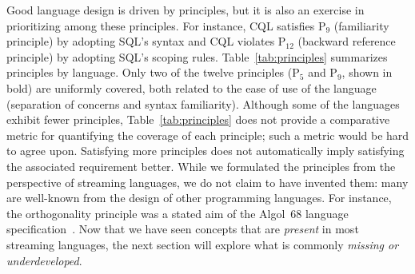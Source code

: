 Good language design is driven by principles, but it is also an
exercise in prioritizing among these principles. For instance, CQL
satisfies P$_9$ (familiarity principle) by adopting SQL's syntax and
CQL violates P$_{12}$ (backward reference principle) by adopting SQL's
scoping rules. Table~\ref{tab:principles} summarizes principles by
language.  Only two of the twelve principles (P$_5$ and P$_9$, shown
in bold) are uniformly covered, both related to the ease of use of the
language (separation of concerns and syntax familiarity).  Although
some of the languages exhibit fewer principles,
Table~\ref{tab:principles} does not provide a comparative metric for
quantifying the coverage of each principle; such a metric would be
hard to agree upon. Satisfying more principles does not automatically
imply satisfying the associated requirement better. While
we formulated the principles from the perspective of streaming
languages, we do not claim to have invented them: many are well-known
from the design of other programming languages. For instance, the
orthogonality principle was a stated aim of the Algol~68 language
specification~\cite{vanwijngaarden_et_al_1975}. Now that we have seen
concepts that are \emph{present} in most streaming languages, the next
section will explore what is commonly \emph{missing or
  underdeveloped}.
